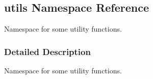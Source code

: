 \hypertarget{namespaceutils}{}\subsection{utils Namespace Reference}
\label{namespaceutils}


Namespace for some utility functions.  




\subsubsection{Detailed Description}
Namespace for some utility functions. 